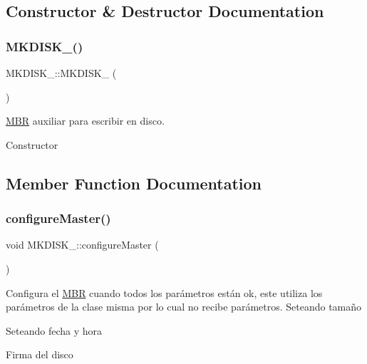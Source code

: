 \subsection{Constructor \& Destructor Documentation}
\mbox{\label{classMKDISK___a320ed310d37d0912e1d96000213aed35}} 
\subsubsection{\texorpdfstring{M\+K\+D\+I\+S\+K\+\_\+()}{MKDISK\_()}}
{\footnotesize\ttfamily M\+K\+D\+I\+S\+K\+\_\+\+::\+M\+K\+D\+I\+S\+K\+\_\+ (\begin{DoxyParamCaption}{ }\end{DoxyParamCaption})\hspace{0.3cm}{\ttfamily [inline]}}



\hyperlink{structMBR}{M\+BR} auxiliar para escribir en disco. 

Constructor 

\subsection{Member Function Documentation}
\mbox{\label{classMKDISK___a7eee0fd7b056178946930a5e6bedf643}} 
\subsubsection{\texorpdfstring{configure\+Master()}{configureMaster()}}
{\footnotesize\ttfamily void M\+K\+D\+I\+S\+K\+\_\+\+::configure\+Master (\begin{DoxyParamCaption}{ }\end{DoxyParamCaption})}

Configura el \hyperlink{structMBR}{M\+BR} cuando todos los parámetros están ok, este utiliza los parámetros de la clase misma por lo cual no recibe parámetros. Seteando tamaño

Seteando fecha y hora

Firma del disco

